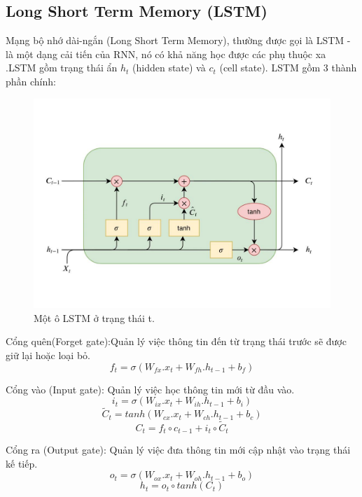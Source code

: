 \documentclass[conference]{IEEEtran}
\begin{document}
\subsection{Long Short Term Memory (LSTM)}
Mạng bộ nhớ dài-ngắn (Long Short Term Memory), thường được gọi là LSTM - là một dạng cải tiến của RNN, nó có khả năng học được các phụ thuộc xa .LSTM gồm trạng thái ẩn \(h_t\) (hidden state) và \(c_t\) (cell state). LSTM gồm 3 thành phần chính:
\begin{figure}[H]
    \centering
    \begin{minipage}{0.25\textwidth}
        \centering
        \includegraphics[width=1\textwidth]{bibliography/figure/LSTM/lstm.pdf}
        \caption{Một ô LSTM ở trạng thái t.}
        \label{fig:LSTM}
    \end{minipage}

\end{figure}
Cổng quên(Forget gate):Quản lý việc thông tin đến từ trạng thái trước sẽ được giữ lại hoặc loại bỏ.
\[f_t=\sigma(W_{fx}.x_t+W_{fh}.h_{t-1}+b_f)\]

Cổng vào (Input gate): Quản lý việc học thông tin mới từ đầu vào.
\[i_t=\sigma(W_{ix}.x_t+W_{ih}.h_{t-1}+b_i)\]
\[{\widetilde{C}}_t=tanh\left(W_{cx}.x_t+W_{ch}.h_{t-1}+b_c\right)\]
\[C_t=f_t\circ c_{t-1}+i_t\circ{\widetilde{C}}_t\]

Cổng ra (Output gate): Quản lý việc đưa thông tin mới cập nhật vào trạng thái kế tiếp.
\[o_t=\sigma(W_{ox}.x_t+W_{oh}.h_{t-1}+b_o)\]
\[h_t=o_t\circ tanh(C_t)\]
\end{document}
